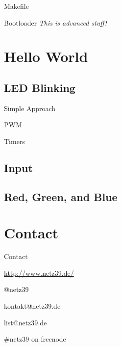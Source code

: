 \documentclass{beamer}
\begin{document}
\begin{frame}{Makefile}
\end{frame}

\begin{frame}{Bootloader}
    \emph{This is advanced stuff!}
\end{frame}

\section{Hello World}

\subsection{LED Blinking}

\begin{frame}{Simple Approach}
\end{frame}

\begin{frame}{PWM}
\end{frame}

\begin{frame}{Timers}
\end{frame}

\subsection{Input}

\subsection{Red, Green, and Blue}

\section{Contact}

\begin{frame}{Contact}
    \begin{center}
        \begin{description}
            \item[WWW] \url{http://www.netz39.de/}
            \item[Twitter/identi.ca] @netz39
            \item[E-Mail] kontakt@netz39.de
            \item[Mailingliste] list@netz39.de
            \item[IRC] \#netz39 on freenode
        \end{description}
    \end{center}
\end{frame}
\end{document}
